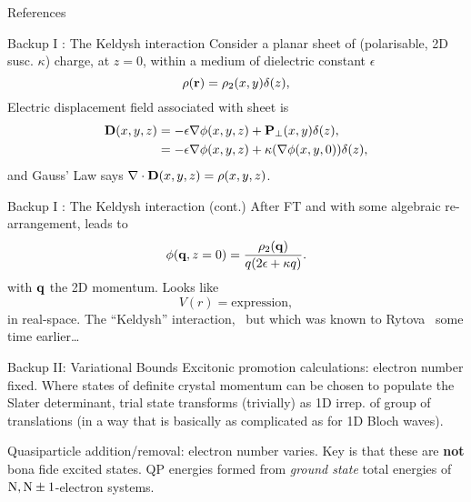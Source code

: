 \documentclass[12pt, pdf, hyperref={draft}, usenames, dvipsnames]{beamer}
\begin{document}
\begin{frame}[t,allowframebreaks]{References}
\printbibliography[]
\end{frame}

\appendix

\begin{frame}[plain]{Backup I : The Keldysh interaction}
Consider a planar sheet of (polarisable, 2D susc. $\kappa$) charge, at $z=0$, within a medium of
dielectric constant $\epsilon$
\begin{equation}
  \rho({\bf r})=\rho_{2}(x,y)\delta(z),
\end{equation}
Electric displacement field associated with sheet is
\begin{align}
  {\bf D}(x,y,z) &= -\epsilon\nabla\phi(x,y,z)+{\bf P}_{\perp}(x,y)\delta(z),
  \nonumber \\
  &= -\epsilon\nabla\phi(x,y,z)+\kappa(\nabla\phi(x,y,0))\delta(z),
\end{align}
and Gauss' Law says $\nabla \cdot {\bf D}(x,y,z)=\rho(x,y,z)$.
\end{frame}
\begin{frame}[plain]{Backup I : The Keldysh interaction (cont.)}
After FT and with some algebraic re-arrangement, leads to
\begin{equation}
  \phi({\bf q},z=0)=\dfrac{\rho_{2}({\bf q})}{q(2\epsilon+\kappa q)}.
\end{equation}
with ${\bf q}$ the 2D momentum. Looks like
\begin{equation}
V(r) = \text{expression},
\end{equation}
in real-space. The ``Keldysh'' interaction,~ but which was known to
Rytova~ some time
earlier\ldots
\end{frame}

\begin{frame}[plain]{Backup II: Variational Bounds}
Excitonic promotion calculations: electron number fixed. Where states of
definite crystal momentum can be chosen to populate the Slater determinant,
trial state transforms (trivially) as 1D irrep. of group of translations (in a
way that is basically as complicated as for 1D Bloch waves).

\vfill

Quasiparticle addition/removal: electron number varies. Key is that these are
\textbf{not} bona fide excited states. QP energies formed from \textit{ground
state} total energies of ${\rm N},{\rm N}\pm1$-electron systems.
\end{frame}
\end{document}
